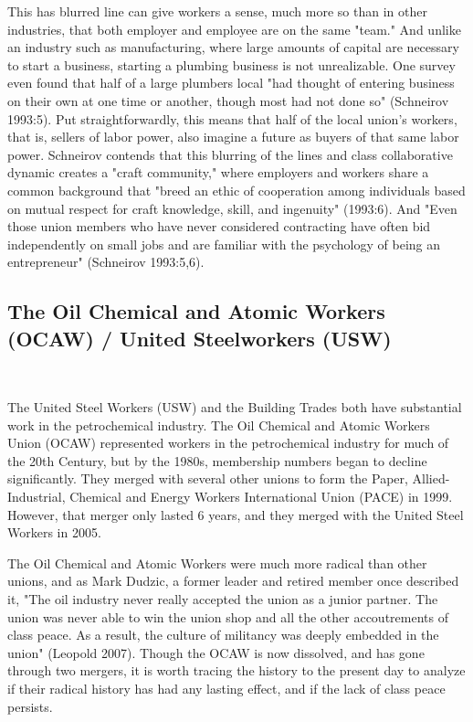 \documentclass[12pt]{article}
\begin{document}
This has blurred line can give workers a sense, much more so than in other industries, that both employer and employee are on the same "team." And unlike an industry such as manufacturing, where large amounts of capital are necessary to start a business, starting a plumbing business is not unrealizable. One survey even found that half of a large plumbers local "had thought of entering business on their own at one time or another, though most had not done so" (Schneirov 1993:5). Put straightforwardly, this means that half of the local union’s workers, that is, sellers of labor power, also imagine a future as buyers of that same labor power. Schneirov contends that this blurring of the lines and class collaborative dynamic creates a "craft community," where employers and workers share a common background that "breed an ethic of cooperation among individuals based on mutual respect for craft knowledge, skill, and ingenuity" (1993:6). And "Even those union members who have never considered contracting have often bid independently on small jobs and are familiar with the psychology of being an entrepreneur" (Schneirov 1993:5,6). 



\subsection{The Oil Chemical and Atomic Workers (OCAW) / United Steelworkers (USW)} \

The United Steel Workers (USW) and the Building Trades both have substantial work in the petrochemical industry. The Oil Chemical and Atomic Workers Union (OCAW) represented workers in the petrochemical industry for much of the 20th Century, but by the 1980s, membership numbers began to decline significantly. They merged with several other unions to form the Paper, Allied-Industrial, Chemical and Energy Workers International Union (PACE) in 1999. However, that merger only lasted 6 years, and they merged with the United Steel Workers in 2005.

The Oil Chemical and Atomic Workers were much more radical than other unions, and as Mark Dudzic, a former leader and retired member once described it, "The oil industry never really accepted the union as a junior partner. The union was never able to win the union shop and all the other accoutrements of class peace. As a result, the culture of militancy was deeply embedded in the union" (Leopold 2007). Though the OCAW is now dissolved, and has gone through two mergers, it is worth tracing the history to the present day to analyze if their radical history has had any lasting effect, and if the lack of class peace persists.
\end{document}
